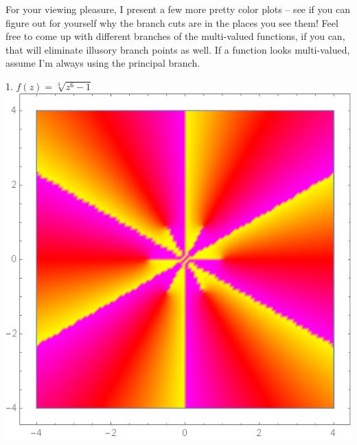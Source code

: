 \documentclass[12pt]{scrartcl}
\begin{document}
For your viewing pleasure, I present a few more pretty color plots -- see if you can figure out for yourself why the branch cuts are in the places you see them! Feel free to come up with different branches of the multi-valued functions, if you can, that will eliminate illusory branch points as well. If a function looks multi-valued, assume I'm always using the principal branch.

\begin{center}
	1. $f(z) = \sqrt[3]{z^6-1}$ \\
	\includegraphics[scale=0.27]{images/cbrtzsixminus1.png}
\end{center}
\end{document}
